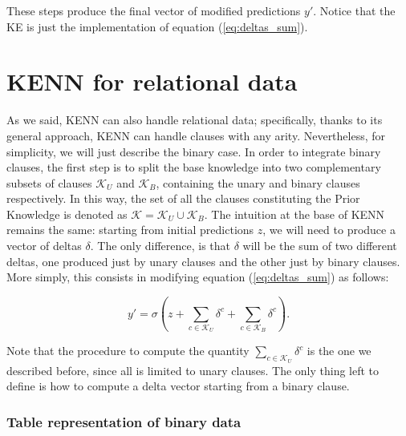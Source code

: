  These steps produce the final vector of modified predictions $y'$. Notice that the KE is just the implementation of equation (\ref{eq:deltas_sum}).
 
 \section{KENN for relational data}
 
 As we said, KENN can also handle relational data; specifically, thanks to its general approach, KENN can handle clauses with any arity. Nevertheless, for simplicity, we will just describe the binary case. In order to integrate binary clauses, the first step is to split the base knowledge into two complementary subsets of clauses $\mathcal{K}_U$ and $\mathcal{K}_B$, containing the unary and binary clauses respectively. In this way, the set of all the clauses constituting the Prior Knowledge is denoted as \mbox{$\mathcal{K} = \mathcal{K}_U \cup \mathcal{K}_B$}. The intuition at the base of KENN remains the same: starting from initial predictions $z$, we will need to produce a vector of deltas $\delta$. The only difference, is that $\delta$ will be the sum of two different deltas, one produced just by unary clauses and the other just by binary clauses. More simply, this consists in modifying equation (\ref{eq:deltas_sum}) as follows:
 
 \begin{equation}
 \label{eq:binary_kenn_eq}
 y'=\sigma(z + \sum_{c\in\mathcal{K}_U}\delta^c + \sum_{c\in\mathcal{K}_B}\delta^c).
 \end{equation}
 
Note that the procedure to compute the quantity $\sum_{c\in \mathcal{K}_U}\delta^c$ is the one we described before, since all is limited to unary clauses. The only thing left to define is how to compute a delta vector starting from a binary clause. 

\subsubsection{Table representation of binary data}

